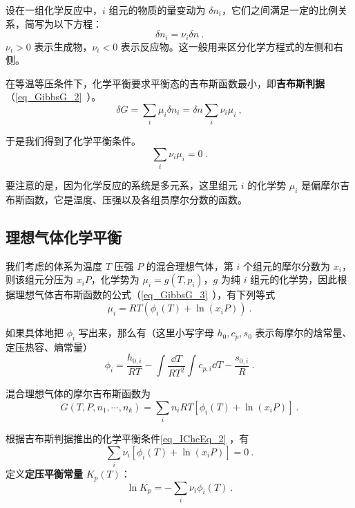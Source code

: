 

设在一组化学反应中，$i$ 组元的物质的量变动为 $\delta n_i$，它们之间满足一定的比例关系，简写为以下方程：
\begin{equation}
\delta n_i=\nu_i \delta n~.
\end{equation}
$\nu_i>0$ 表示生成物，$\nu_i<0$ 表示反应物。这一般用来区分化学方程式的左侧和右侧。

在等温等压条件下，化学平衡要求平衡态的吉布斯函数最小，即\textbf{吉布斯判据}（\autoref{eq_GibbsG_2}~）。
\begin{equation}
\delta G=\sum_i \mu_i\delta n_i=\delta n\sum_i \nu_i\mu_i~,
\end{equation}

于是我们得到了化学平衡条件。
\begin{equation}\label{eq_ICheEq_2}
\sum_i\nu_i\mu_i=0~.
\end{equation}

要注意的是，因为化学反应的系统是多元系，这里组元 $i$ 的化学势 $\mu_i$ 是偏摩尔吉布斯函数，它是温度、压强以及各组员摩尔分数的函数。

\subsection{理想气体化学平衡}

我们考虑的体系为温度 $T$ 压强 $P$ 的混合理想气体，第 $i$ 个组元的摩尔分数为 $x_i$，则该组元分压为 $x_iP$，化学势为 $\mu_i=g(T,p_i)$，$g$ 为纯 $i$ 组元的化学势，因此根据理想气体吉布斯函数的公式（\autoref{eq_GibbsG_3}~），有下列等式
\begin{equation}\label{eq_ICheEq_1}
\mu_i=RT(\phi_i(T)+\ln(x_iP))~.
\end{equation}

如果具体地把 $\phi_i$ 写出来，那么有（这里小写字母 $h_0,c_p,s_0$ 表示每摩尔的焓常量、定压热容、熵常量）
\begin{equation}
\phi_i=\frac{h_{0,i}}{RT}-\int\frac{\dd T}{RT^2}\int c_{p,i}\dd T-\frac{s_{0,i}}{R}~.
\end{equation}

混合理想气体的摩尔吉布斯函数为
\begin{equation}
G(T,P,n_1,\cdots,n_k)=\sum_i n_iRT[\phi_i(T)+\ln(x_iP)]~.
\end{equation}

根据吉布斯判据推出的化学平衡条件\autoref{eq_ICheEq_2} ，有
\begin{equation}\label{eq_ICheEq_3}
\sum_i\nu_i[\phi_i(T)+\ln (x_iP)]=0~.
\end{equation}
定义\textbf{定压平衡常量} $K_p(T)$：
\begin{equation}\label{eq_ICheEq_5}
\ln K_p=-\sum_i\nu_i\phi_i(T)~.
\end{equation}

